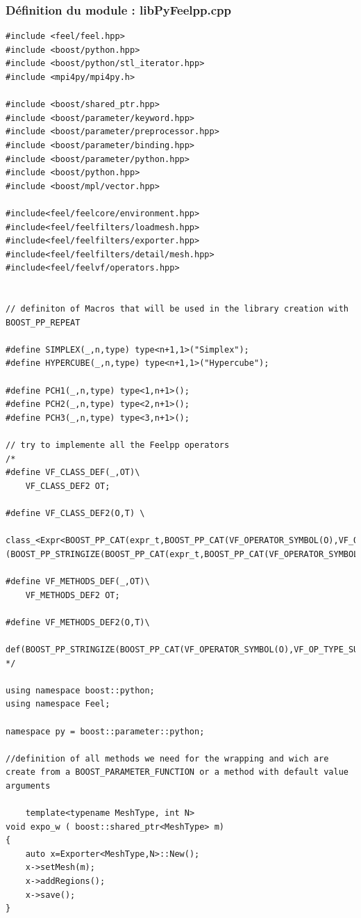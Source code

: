 \documentclass[french,12pt]{article}
\begin{document}
\subsubsection{Définition du module : libPyFeelpp.cpp}
\begin{lstlisting}
#include <feel/feel.hpp>
#include <boost/python.hpp>
#include <boost/python/stl_iterator.hpp>
#include <mpi4py/mpi4py.h>

#include <boost/shared_ptr.hpp>
#include <boost/parameter/keyword.hpp>
#include <boost/parameter/preprocessor.hpp>
#include <boost/parameter/binding.hpp>
#include <boost/parameter/python.hpp>
#include <boost/python.hpp>
#include <boost/mpl/vector.hpp>

#include<feel/feelcore/environment.hpp>
#include<feel/feelfilters/loadmesh.hpp>
#include<feel/feelfilters/exporter.hpp>
#include<feel/feelfilters/detail/mesh.hpp>
#include<feel/feelvf/operators.hpp>


// definiton of Macros that will be used in the library creation with BOOST_PP_REPEAT

#define SIMPLEX(_,n,type) type<n+1,1>("Simplex");
#define HYPERCUBE(_,n,type) type<n+1,1>("Hypercube");

#define PCH1(_,n,type) type<1,n+1>();
#define PCH2(_,n,type) type<2,n+1>();
#define PCH3(_,n,type) type<3,n+1>();

// try to implemente all the Feelpp operators 
/*
#define VF_CLASS_DEF(_,OT)\
    VF_CLASS_DEF2 OT;

#define VF_CLASS_DEF2(O,T) \
     class_<Expr<BOOST_PP_CAT(expr_t,BOOST_PP_CAT(VF_OPERATOR_SYMBOL(O),VF_OP_TYPE_SUFFIX(T)))>>(BOOST_PP_STRINGIZE(BOOST_PP_CAT(expr_t,BOOST_PP_CAT(VF_OPERATOR_SYMBOL(O),VF_OP_TYPE_SUFFIX(T)))),no_init)

#define VF_METHODS_DEF(_,OT)\
    VF_METHODS_DEF2 OT;
    
#define VF_METHODS_DEF2(O,T)\
    def(BOOST_PP_STRINGIZE(BOOST_PP_CAT(VF_OPERATOR_SYMBOL(O),VF_OP_TYPE_SUFFIX(T))),Feel::vf::BOOST_PP_CAT(VF_OPERATOR_SYMBOL(O),VF_OP_TYPE_SUFFIX(T)))       
*/

using namespace boost::python;
using namespace Feel;

namespace py = boost::parameter::python;

//definition of all methods we need for the wrapping and wich are create from a BOOST_PARAMETER_FUNCTION or a method with default value arguments
 
    template<typename MeshType, int N>
void expo_w ( boost::shared_ptr<MeshType> m)
{
    auto x=Exporter<MeshType,N>::New();
    x->setMesh(m);
    x->addRegions();
    x->save();
}


\end{lstlisting}
\end{document}
